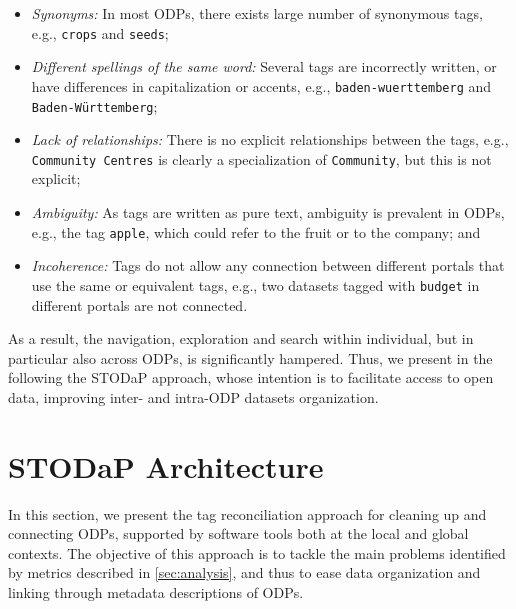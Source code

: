 \begin{itemize}
	\item \emph{Synonyms:} In most ODPs, there exists large number of synonymous tags, e.g., \texttt{crops} and \texttt{seeds};
	\item \emph{Different spellings of the same word:} Several tags are incorrectly written, or have differences in capitalization or accents, e.g., \texttt{baden-wuerttemberg} and \texttt{Baden-W\"{u}rttemberg};
	\item \emph{Lack of relationships:} There is no explicit relationships between the tags, e.g., \texttt{Community Centres} is clearly a specialization of \texttt{Community}, but this is not explicit;
	\item \emph{Ambiguity:} As tags are written as pure text, ambiguity is prevalent in ODPs, e.g., the tag \texttt{apple}, which could refer to the fruit or to the company; and
	\item \emph{Incoherence:} Tags do not allow any connection between different portals that use the same or equivalent tags, e.g., two datasets tagged with \texttt{budget} in different portals are not connected.
\end{itemize}

As a result, the navigation, exploration and search within individual, but in particular also across ODPs, is significantly hampered.
Thus, we present in the following the STODaP approach, whose intention is to facilitate access to open data, improving inter- and intra-ODP datasets organization.


\section{STODaP Architecture}
\label{sec:stodap_architecture}

In this section, we present the tag reconciliation approach for cleaning up and connecting ODPs, supported by software tools both at the local and global contexts.
The objective of this approach is to tackle the main problems identified by metrics described in \autoref{sec:analysis}, and thus to ease data organization and linking through metadata descriptions of ODPs.

